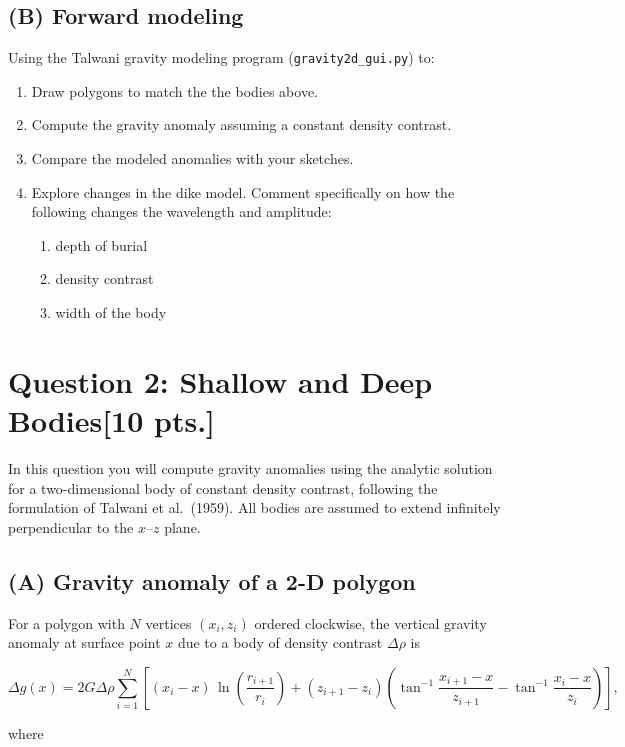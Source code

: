 \documentclass[11pt,a4paper,final]{article}
\begin{document}
\subsection*{(B) Forward modeling}
Using the Talwani gravity modeling program (\verb+gravity2d_gui.py+) to:
\begin{enumerate}
    \item Draw polygons to match the the bodies above.
    \item Compute the gravity anomaly assuming a constant density contrast.
    \item Compare the modeled anomalies with your sketches.
    \item Explore changes in the dike model. Comment specifically on how the following changes the wavelength and amplitude:
    \begin{enumerate}
        \item depth of burial
        \item density contrast
        \item width of the body
    \end{enumerate}
\end{enumerate}

\clearpage
\section*{Question 2: Shallow and Deep Bodies\hfill [10 pts.]}

In this question you will compute gravity anomalies using the analytic solution for
a two-dimensional body of constant density contrast, following the formulation of
Talwani et al.\ (1959). All bodies are assumed to extend infinitely perpendicular to the
$x$--$z$ plane.

\subsection*{(A) Gravity anomaly of a 2-D polygon}

For a polygon with $N$ vertices $(x_i, z_i)$ ordered clockwise,
the vertical gravity anomaly at surface point $x$ due to a body of
density contrast $\Delta\rho$ is

\[
\Delta g(x) =
2 G \Delta\rho
\sum_{i=1}^{N}
\left[
(x_i - x)\,
\ln\!\left(\frac{r_{i+1}}{r_i}\right)
+
(z_{i+1}-z_i)
\left(
\tan^{-1}\!\frac{x_{i+1}-x}{z_{i+1}}
-
\tan^{-1}\!\frac{x_i-x}{z_i}
\right)
\right],
\]

where
\end{document}
